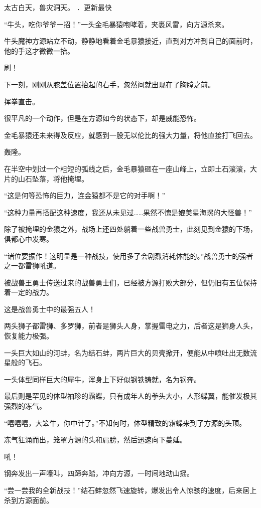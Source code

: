 
\begin{this_body}

太古白天，兽灾洞天。 ．更新最快

“牛头，吃你爷爷一招！”一头金毛暴猿咆哮着，夹裹风雷，向方源杀来。

牛头魔神方源站立不动，静静地看着金毛暴猿接近，直到对方冲到自己的面前时，他的手这才微微一抬。

刷！

下一刻，刚刚从膝盖位置抬起的右手，忽然间就出现在了胸膛之前。

挥拳直击。

很平凡的一个动作，但是在方源如今的状态下，却是威能恐怖。

金毛暴猿还未来得及反应，就感到一股无以伦比的强大力量，将他直接打飞回去。

轰隆。

在半空中划过一个粗短的弧线之后，金毛暴猿砸在一座山峰上，立即土石滚滚，大片的山石坠落，将他掩埋。

“这是何等恐怖的巨力，连金猿都不是它的对手啊！”

“这种力量再搭配这种速度，我还从未见过……果然不愧是媲美星海螺的大怪兽！”

除了被掩埋的金猿之外，战场上还四处躺着一些战兽勇士，此刻见到金猿的下场，俱都心中发寒。

“诸位要振作！这明显是一种战技，使用多了会剧烈消耗体能的。”战兽勇士的强者之一都雷狮吼道。

被战兽王勇士传送过来的战兽勇士们，已经被方源打败大部分，但仍旧有五位保持着一定的战力。

这是战兽勇士中的最强五人！

两头狮子都雷狮、多罗狮，前者是狮头人身，掌握雷电之力，后者这是狮身人头，恢复能力极强。

一头巨大如山的河蚌，名为结石蚌，两片巨大的贝壳掀开，便能从中喷吐出无数流星般的飞石。

一头体型同样巨大的犀牛，浑身上下好似钢铁铸就，名为钢奔。

最后则是罕见的体型袖珍的霜蝶，只有成年人的拳头大小，人形蝶翼，能催发极其强烈的冻气。

“嘻嘻嘻，大笨牛，你中计了。”不知何时，体型精致的霜蝶来到了方源的头顶。

冻气狂涌而出，笼罩方源的头和肩膀，然后迅速向下蔓延。

吼！

钢奔发出一声嚎叫，四蹄奔踏，冲向方源，一时间地动山摇。

“尝一尝我的全新战技！”结石蚌忽然飞速旋转，爆发出令人惊骇的速度，后来居上杀到方源面前。


\end{this_body}
